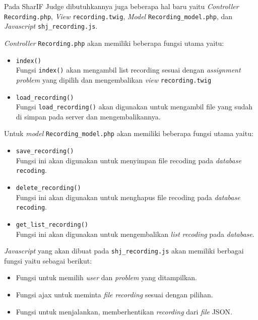 \documentclass[a4paper,twoside]{article}
\begin{document}
\begin{enumerate}
	      Pada SharIF Judge dibutuhkannya juga beberapa hal baru yaitu \textit{Controller} \verb|Recording.php|, \textit{View} \verb|recording.twig|, \textit{Model} \verb|Recording_model.php|, dan \textit{Javascript} \verb|shj_recording.js|.

	      \vspace{0.15cm}
	      \textit{Controller} \verb|Recording.php| akan memiliki beberapa fungsi utama yaitu:
	      \begin{itemize}
		      \item \verb|index()| \\
		            Fungsi \verb|index()| akan mengambil list recording sesuai dengan \textit{assignment} \textit{problem} yang dipilih dan mengembalikan \textit{view} \verb|recording.twig|
		      \item \verb|load_recording()| \\
		            Fungsi \verb|load_recording()| akan digunakan untuk mengambil file yang sudah di simpan pada server dan mengembalikannya.
	      \end{itemize}

	      \vspace{0.15cm}
	      Untuk \textit{model} \verb|Recording_model.php| akan memiliki beberapa fungsi utama yaitu:
	      \begin{itemize}
		      \item \verb|save_recording()| \\
		            Fungsi ini akan digunakan untuk menyimpan file recoding pada \textit{database} \verb|recoding|.
		      \item \verb|delete_recording()| \\
		            Fungsi ini akan digunakan untuk menghapus file recoding pada \textit{database} \verb|recoding|.
		      \item \verb|get_list_recording()| \\
		            Fungsi ini akan digunakan untuk mengembalikan \textit{list recoding} pada \textit{database}.
	      \end{itemize}

	      \vspace{0.15cm}
	      \textit{Javascript} yang akan dibuat pada \verb|shj_recording.js| akan memiliki berbagai fungsi yaitu sebagai berikut:

	      \begin{itemize}
		      \item Fungsi untuk memilih \textit{user} dan \textit{problem} yang ditampilkan.
		      \item Fungsi ajax untuk meminta \textit{file recording} sesuai dengan pilihan.
		      \item Fungsi untuk menjalankan, memberhentikan \textit{recording} dari \textit{file} JSON.
	      \end{itemize}


\end{enumerate}
\end{document}
